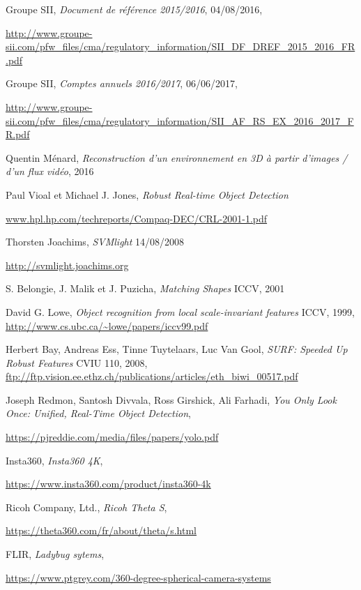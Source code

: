 \begin{thebibliography}{9}
	
		Groupe SII,
		\emph{Document de référence 2015/2016},
		04/08/2016,
		\par
		\url{http://www.groupe-sii.com/pfw_files/cma/regulatory_information/SII_DF_DREF_2015_2016_FR.pdf}
	
		Groupe SII,
		\emph{Comptes annuels 2016/2017},
		06/06/2017,
		\par
		\url{http://www.groupe-sii.com/pfw_files/cma/regulatory_information/SII_AF_RS_EX_2016_2017_FR.pdf}
	
		Quentin Ménard,
		\emph{Reconstruction d’un environnement en 3D à partir d’images / d’un flux vidéo},
		2016
	
		Paul Vioal et Michael J. Jones,
		\emph{Robust Real-time Object Detection}
		\par
		\url{www.hpl.hp.com/techreports/Compaq-DEC/CRL-2001-1.pdf}
	
		Thorsten Joachims,
		\emph{SVMlight}
		14/08/2008
		\par
		\url{http://svmlight.joachims.org}
	
		S. Belongie, J. Malik et J. Puzicha,
		\emph{Matching Shapes}
		ICCV,
		2001

		David G. Lowe,
		\emph{Object recognition from local scale-invariant features}
		ICCV,
		1999,
		\url{http://www.cs.ubc.ca/~lowe/papers/iccv99.pdf}

		Herbert Bay, Andreas Ess, Tinne Tuytelaars, Luc Van Gool,
		\emph{SURF: Speeded Up Robust Features}
		CVIU 110,
		2008,
		\url{ftp://ftp.vision.ee.ethz.ch/publications/articles/eth_biwi_00517.pdf}
	
		Joseph Redmon, Santosh Divvala, Ross Girshick, Ali Farhadi,
		\emph{You Only Look Once: Unified, Real-Time Object Detection},
		\par
		\url{https://pjreddie.com/media/files/papers/yolo.pdf}
	
		Insta360,
		\emph{Insta360 4K},
		\par
		\url{https://www.insta360.com/product/insta360-4k}
	
		Ricoh Company, Ltd.,
		\emph{Ricoh Theta S},
		\par
		\url{https://theta360.com/fr/about/theta/s.html}
	
		FLIR,
		\emph{Ladybug sytems},
		\par
		\url{https://www.ptgrey.com/360-degree-spherical-camera-systems}
		

\end{thebibliography}
